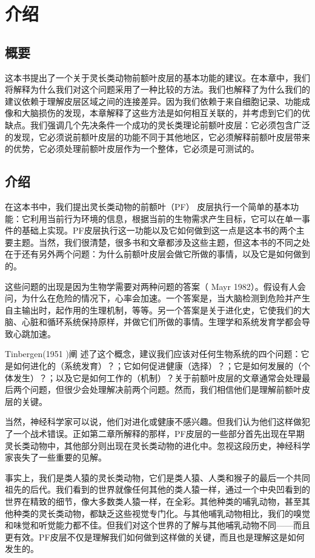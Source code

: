 

\chapter{介绍}

\section{概要}
这本书提出了一个关于灵长类动物前额叶皮层的基本功能的建议。在本章中，我们将解释为什么我们对这个问题采用了一种比较的方法。我们也解释了为什么我们的建议依赖于理解皮层区域之间的连接差异。因为我们依赖于来自细胞记录、功能成像和大脑损伤的发现，本章解释了这些方法是如何相互关联的，并考虑到它们的优缺点。我们强调几个先决条件一个成功的灵长类理论前额叶皮层：它必须包含广泛的发现，它必须说前额叶皮层的功能不同于其他地区，它必须解释前额叶皮层带来的优势，它必须处理前额叶皮层作为一个整体，它必须是可测试的。

\section{介绍}
在这本书中，我们提出灵长类动物的前额叶（PF） 皮层执行一个简单的基本功能：它利用当前行为环境的信息，根据当前的生物需求产生目标，它可以在单一事件的基础上实现。PF皮层执行这一功能以及它如何做到这一点是这本书的两个主要主题。当然，我们很清楚，很多书和文章都涉及这些主题，但这本书的不同之处在于还有另外两个问题：为什么前额叶皮层会做它所做的事情，以及它是如何做到的。
\par 
这些问题的出现是因为生物学需要对两种问题的答案（ Mayr 1982）。假设有人会问，为什么在危险的情况下，心率会加速。一个答案是，当大脑检测到危险并产生自主输出时，起作用的生理机制，等等。另一个答案是关于进化史，它使我们的大脑、心脏和循环系统保持原样，并做它们所做的事情。生理学和系统发育学都会导致心跳加速。
\par 
Tinbergen(1951 )阐 述了这个概念，建议我们应该对任何生物系统的四个问题：它是如何进化的（系统发育）？；它如何促进健康（选择）？；它是如何发展的（个体发生）？；以及它是如何工作的（机制）？关于前额叶皮层的文章通常会处理最后两个问题，但很少会处理解决前两个问题。然而，我们相信他们是理解前额叶皮层的关键。
\par 
当然，神经科学家可以说，他们对进化或健康不感兴趣。但我们认为他们这样做犯了一个战术错误。正如第二章所解释的那样，PF皮层的一些部分首先出现在早期灵长类动物中，其他部分则出现在灵长类动物的进化中。忽视这段历史，神经科学家丧失了一些重要的见解。
\par 
事实上，我们是类人猿的灵长类动物，它们是类人猿、人类和猴子的最后一个共同祖先的后代。我们看到的世界就像任何其他的类人猿一样，通过一个中央凹看到的世界在精致的细节，像大多数类人猿一样，在全彩。其他种类的哺乳动物，甚至其他种类的灵长类动物，都缺乏这些视觉专门化。与其他哺乳动物相比，我们的嗅觉和味觉和听觉能力都不佳。但我们对这个世界的了解与其他哺乳动物不同——而且更有效。PF皮层不仅是理解我们如何做到这样做的关键，而且也是理解这是如何发生的。

